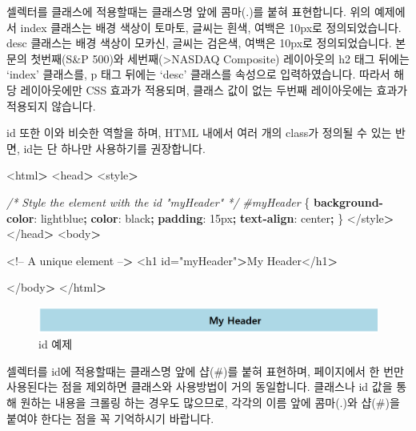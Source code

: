 \documentclass[12pt,]{book}
\newenvironment{Shaded}{\begin{snugshade}}{\end{snugshade}}
\newcommand{\CommentTok}[1]{\textcolor[rgb]{0.56,0.35,0.01}{\textit{#1}}}
\newcommand{\ConstantTok}[1]{\textcolor[rgb]{0.00,0.00,0.00}{#1}}
\newcommand{\DataTypeTok}[1]{\textcolor[rgb]{0.13,0.29,0.53}{#1}}
\newcommand{\DecValTok}[1]{\textcolor[rgb]{0.00,0.00,0.81}{#1}}
\newcommand{\KeywordTok}[1]{\textcolor[rgb]{0.13,0.29,0.53}{\textbf{#1}}}
\newcommand{\NormalTok}[1]{#1}
\newcommand{\OperatorTok}[1]{\textcolor[rgb]{0.81,0.36,0.00}{\textbf{#1}}}
\newcommand{\PreprocessorTok}[1]{\textcolor[rgb]{0.56,0.35,0.01}{\textit{#1}}}
\begin{document}
셀렉터를 클래스에 적용할때는 클래스명 앞에 콤마(.)를 붙혀 표현합니다. 위의 예제에서 index 클래스는 배경 색상이 토마토, 글씨는 흰색, 여백은 10px로 정의되었습니다. desc 클래스는 배경 색상이 모카신, 글씨는 검은색, 여백은 10px로 정의되었습니다. 본문의 첫번째(S\&P 500)와 세번째(\textgreater{}NASDAQ Composite) 레이아웃의 h2 태그 뒤에는 `index' 클래스를, p 태그 뒤에는 `desc' 클래스를 속성으로 입력하였습니다. 따라서 해당 레이아웃에만 CSS 효과가 적용되며, 클래스 값이 없는 두번째 레이아웃에는 효과가 적용되지 않습니다.

id 또한 이와 비슷한 역할을 하며, HTML 내에서 여러 개의 class가 정의될 수 있는 반면, id는 단 하나만 사용하기를 권장합니다.

\begin{Shaded}
\begin{Highlighting}[]
\NormalTok{<html}\OperatorTok{>}
\NormalTok{<head}\OperatorTok{>}
\NormalTok{<style}\OperatorTok{>}

\CommentTok{/* Style the element with the id "myHeader" */}
\PreprocessorTok{#myHeader}\NormalTok{ \{}
  \KeywordTok{background-color}\NormalTok{: }\ConstantTok{lightblue}\OperatorTok{;}
  \KeywordTok{color}\NormalTok{: }\ConstantTok{black}\OperatorTok{;}
  \KeywordTok{padding}\NormalTok{: }\DecValTok{15}\DataTypeTok{px}\OperatorTok{;}
  \KeywordTok{text-align}\NormalTok{: }\DecValTok{center}\OperatorTok{;}
\NormalTok{\}}
\NormalTok{</style}\OperatorTok{>}
\NormalTok{</head}\OperatorTok{>}
\NormalTok{<body}\OperatorTok{>}

\NormalTok{<!-- A unique element --}\OperatorTok{>}
\NormalTok{<h1 id="myHeader"}\OperatorTok{>}\NormalTok{My Header</h1}\OperatorTok{>}

\NormalTok{</body}\OperatorTok{>}
\NormalTok{</html}\OperatorTok{>}
\end{Highlighting}
\end{Shaded}

\begin{figure}[h]

{\centering \includegraphics[width=0.7\linewidth]{images/html_10} 

}

\caption{id 예제}\label{fig:unnamed-chunk-24}
\end{figure}

셀렉터를 id에 적용할때는 클래스명 앞에 샵(\#)를 붙혀 표현하며, 페이지에서 한 번만 사용된다는 점을 제외하면 클래스와 사용방법이 거의 동일합니다. 클래스나 id 값을 통해 원하는 내용을 크롤링 하는 경우도 많으므로, 각각의 이름 앞에 콤마(.)와 샵(\#)을 붙여야 한다는 점을 꼭 기억하시기 바랍니다.
\end{document}
